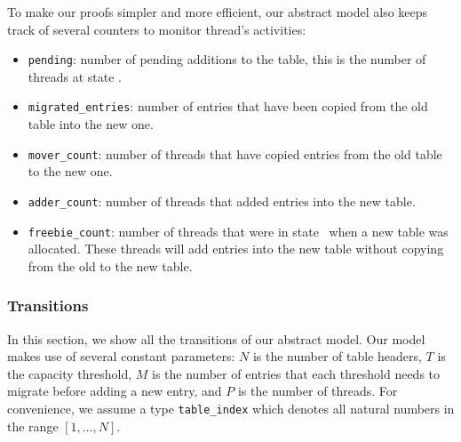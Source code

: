 To make our proofs simpler and more efficient, our abstract model also
keeps track of several counters to monitor thread's activities:

\begin{itemize}

\item \texttt{pending}: number of pending additions to the table, this
  is the number of threads at state \pcone.

\item \texttt{migrated\_entries}: number of entries that have been
  copied from the old table into the new one.

\item \texttt{mover\_count}: number of threads that have copied
  entries from the old table to the new one.

\item \texttt{adder\_count}: number of threads that added entries into
  the new table.
  
\item \texttt{freebie\_count}: number of threads that were in state
  \pcone\ when a new table was allocated. These threads will add
  entries into the new table without copying from the old to the new
  table.

\end{itemize}  

\subsubsection{Transitions}

In this section, we show all the transitions of our abstract
model. Our model makes use of several constant parameters: $N$ is the
number of table headers, $T$ is the capacity threshold, $M$ is the
number of entries that each threshold needs to migrate before adding a
new entry, and $P$ is the number of threads. For convenience, we
assume a type \texttt{table\_index} which denotes all natural numbers
in the range $[1,\ldots,N]$.


